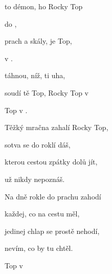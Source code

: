 

\zs
{} to démon,  ho Rocky Top

 do  ,

prach a skály,  je  Top,

 v  .
\ks

\zr
{} táhnou,  níž,  ti uha,

soudí tě  Top, Rocky Top v 

 Top v .
\kr

\zs
Těžký mračna zahalí Rocky Top,

sotva se do roklí dáš,

kterou cestou zpátky dolů jít,

už nikdy nepoznáš.
\ks

\zr  \kr

\zs
Na dně rokle do prachu zahodí

každej, co na cestu měl,

jedinej chlap se prostě nehodí,

nevím, co by tu chtěl.
\ks

\zr
{} Top v  
 
\kr


\kp
